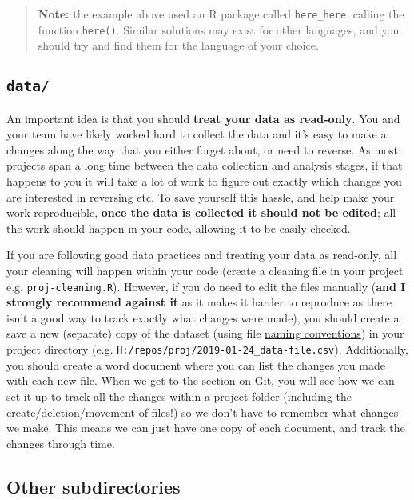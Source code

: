 \documentclass[]{book}
\begin{document}
\begin{quote}
\textbf{Note:} the example above used an R package called \texttt{here\_here}, calling the function \texttt{here()}. Similar solutions may exist for other languages, and you should try and find them for the language of your choice.
\end{quote}

\hypertarget{data}{%
\subsection{\texorpdfstring{\texttt{data/}}{data/}}\label{data}}

An important idea is that you should \textbf{treat your data as read-only}. You and your team have likely worked hard to collect the data and it's easy to make a changes along the way that you either forget about, or need to reverse. As most projects span a long time between the data collection and analysis stages, if that happens to you it will take a lot of work to figure out exactly which changes you are interested in reversing etc. To save yourself this hassle, and help make your work reproducible, \textbf{once the data is collected it should not be edited}; all the work should happen in your code, allowing it to be easily checked.

If you are following good data practices and treating your data as read-only, all your cleaning will happen within your code (create a cleaning file in your project e.g. \texttt{proj-cleaning.R}). However, if you do need to edit the files manually (\textbf{and I strongly recommend against it} as it makes it harder to reproduce as there isn't a good way to track exactly what changes were made), you should create a save a new (separate) copy of the dataset (using file \protect\hyperlink{how-to-name-files}{naming conventions}) in your project directory (e.g. \texttt{H:/repos/proj/2019-01-24\_data-file.csv}). Additionally, you should create a word document where you can list the changes you made with each new file. When we get to the section on \protect\hyperlink{git}{Git}, you will see how we can set it up to track all the changes within a project folder (including the create/deletion/movement of files!) so we don't have to remember what changes we make. This means we can just have one copy of each document, and track the changes through time.

\hypertarget{other-subdirectories}{%
\subsection{Other subdirectories}\label{other-subdirectories}}
\end{document}
